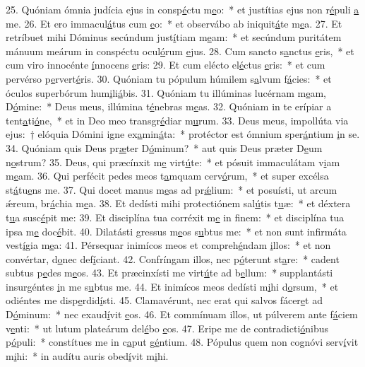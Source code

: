 25. Quóniam ómnia judícia ejus in consp\uline{é}ctu m\uline{e}o:~* et justítias ejus non r\uline{é}puli \uline{a} me.
26. Et ero immacul\uline{á}tus cum \uline{e}o:~* et observábo ab iniquit\uline{á}te m\uline{e}a.
27. Et retríbuet mihi Dóminus secúndum just\uline{í}tiam m\uline{e}am:~* et secúndum puritátem mánuum meárum in conspéctu ocul\uline{ó}rum \uline{e}jus.
28. Cum sancto s\uline{a}nctus \uline{e}ris,~* et cum viro innocénte \uline{í}nnocens \uline{e}ris:
29. Et cum elécto el\uline{é}ctus \uline{e}ris:~* et cum pervérso p\uline{e}rvert\uline{é}ris.
30. Quóniam tu pópulum húmilem s\uline{a}lvum f\uline{á}cies:~* et óculos superbórum hum\uline{i}li\uline{á}bis.
31. Quóniam tu illúminas lucérnam m\uline{e}am, D\uline{ó}mine:~* Deus meus, illúmina t\uline{é}nebras m\uline{e}as.
32. Quóniam in te erípiar a tent\uline{a}ti\uline{ó}ne,~* et in Deo meo transgr\uline{é}diar m\uline{u}rum.
33. Deus meus, impollúta via ejus:~† elóquia Dómini igne ex\uline{a}min\uline{á}ta:~* protéctor est ómnium sper\uline{á}ntium \uline{i}n se.
34. Quóniam quis Deus pr\uline{æ}ter D\uline{ó}minum?~* aut quis Deus præter D\uline{e}um n\uline{o}strum?
35. Deus, qui præcínxit m\uline{e} virt\uline{ú}te:~* et pósuit immaculátam v\uline{i}am m\uline{e}am.
36. Qui perfécit pedes meos t\uline{a}mquam cerv\uline{ó}rum,~* et super excélsa st\uline{á}tu\uline{e}ns me.
37. Qui docet manus m\uline{e}as ad pr\uline{ǽ}lium:~* et posuísti, ut arcum ǽreum, br\uline{á}chia m\uline{e}a.
38. Et dedísti mihi protectiónem sal\uline{ú}tis t\uline{u}æ:~* et déxtera t\uline{u}a susc\uline{é}pit me:
39. Et disciplína tua corréxit m\uline{e} in f\uline{i}nem:~* et disciplína tua ipsa m\uline{e} doc\uline{é}bit.
40. Dilatásti gressus m\uline{e}os s\uline{u}btus me:~* et non sunt infirmáta vest\uline{í}gia m\uline{e}a:
41. Pérsequar inimícos meos et compreh\uline{é}ndam \uline{i}llos:~* et non convértar, d\uline{o}nec def\uline{í}ciant.
42. Confríngam illos, nec p\uline{ó}terunt st\uline{a}re:~* cadent subtus p\uline{e}des m\uline{e}os.
43. Et præcinxísti me virt\uline{ú}te ad b\uline{e}llum:~* supplantásti insurgéntes \uline{i}n me s\uline{u}btus me.
44. Et inimícos meos dedísti m\uline{i}hi d\uline{o}rsum,~* et odiéntes me disp\uline{e}rdid\uline{í}sti.
45. Clamavérunt, nec erat qui salvos fácer\uline{e}t ad D\uline{ó}minum:~* nec exaud\uline{í}vit \uline{e}os.
46. Et commínuam illos, ut púlverem ante f\uline{á}ciem v\uline{e}nti:~* ut lutum plateárum del\uline{é}bo \uline{e}os.
47. Eripe me de contradicti\uline{ó}nibus p\uline{ó}puli:~* constítues me in c\uline{a}put g\uline{é}ntium.
48. Pópulus quem non cognóvi serv\uline{í}vit m\uline{i}hi:~* in audítu auris obed\uline{í}vit m\uline{i}hi.

